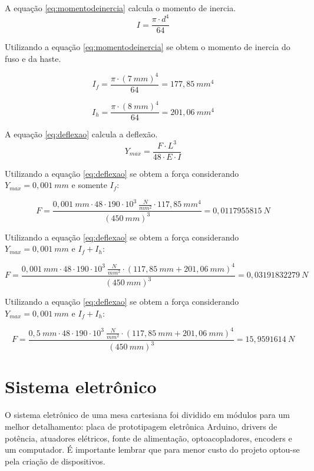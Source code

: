 A equação \ref{eq:momentodeinercia} calcula o momento de inercia.
\begin{equation}\label{eq:momentodeinercia}
    I = \frac{\pi \cdot d^{4}}{64}
\end{equation}

Utilizando a equação \ref{eq:momentodeinercia} se obtem o momento de inercia do fuso e da haste.

$$I_{f} = \frac{\pi \cdot (7~mm)^{4}}{64} = 177,85~mm^{4}$$ 

$$I_{h} = \frac{\pi \cdot (8~mm)^{4}}{64} = 201,06~mm^{4}$$   

A equação \ref{eq:deflexao} calcula a deflexão.
\begin{equation}\label{eq:deflexao}
    Y_{max} = \frac{F \cdot L^{3}}{48 \cdot E \cdot I}
\end{equation}

Utilizando a equação \ref{eq:deflexao} se obtem a força considerando $Y_{max} = 0,001~mm$ e somente $I_{f}$:

$$F = \frac{0,001~mm \cdot 48 \cdot 190 \cdot 10^{3}~\frac{N}{mm^{2}} \cdot 117,85~mm^{4}}{(450~mm)^{3}} = 0,0117955815~N$$

Utilizando a equação \ref{eq:deflexao} se obtem a força considerando $Y_{max} = 0,001~mm$ e  $I_{f} + I_{h}$:

$$F = \frac{0,001~mm \cdot 48 \cdot 190 \cdot 10^{3}~\frac{N}{mm^{2}} \cdot (117,85~mm + 201,06~mm)^{4}}{(450~mm)^{3}} = 0,03191832279~N$$

Utilizando a equação \ref{eq:deflexao} se obtem a força considerando $Y_{max} = 0,001~mm$ e  $I_{f} + I_{h}$:

$$F = \frac{0,5~mm \cdot 48 \cdot 190 \cdot 10^{3}~\frac{N}{mm^{2}} \cdot (117,85~mm + 201,06~mm)^{4}}{(450~mm)^{3}} = 15,9591614~N$$
        
\section{Sistema eletrônico}\label{sec:metsisele}

O sistema eletrônico de uma mesa cartesiana foi dividido em módulos para um melhor detalhamento: 
placa de prototipagem eletrônica Arduino, drivers de potência, atuadores elétricos, fonte de alimentação, 
optoacopladores, encoders e um computador. É importante lembrar que para menor custo do projeto optou-se 
pela criação de dispositivos.

